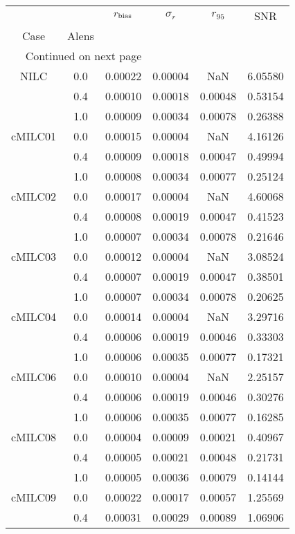 \begin{longtable}{cccccc}
\toprule
     &     &  $r_{\rm bias}$  &  $\sigma_r$ &  $r_{95}$ &     SNR \\
Case & Alens &                  &             &           &         \\
\midrule
\endhead
\midrule
\multicolumn{3}{r}{{Continued on next page}} \\
\midrule
\endfoot

\bottomrule
\endlastfoot
NILC & 0.0 & 0.00022 & 0.00004 & NaN & 6.05580 \\
     & 0.4 & 0.00010 & 0.00018 & 0.00048 & 0.53154 \\
     & 1.0 & 0.00009 & 0.00034 & 0.00078 & 0.26388 \\
cMILC01 & 0.0 & 0.00015 & 0.00004 & NaN & 4.16126 \\
     & 0.4 & 0.00009 & 0.00018 & 0.00047 & 0.49994 \\
     & 1.0 & 0.00008 & 0.00034 & 0.00077 & 0.25124 \\
cMILC02 & 0.0 & 0.00017 & 0.00004 & NaN & 4.60068 \\
     & 0.4 & 0.00008 & 0.00019 & 0.00047 & 0.41523 \\
     & 1.0 & 0.00007 & 0.00034 & 0.00078 & 0.21646 \\
cMILC03 & 0.0 & 0.00012 & 0.00004 & NaN & 3.08524 \\
     & 0.4 & 0.00007 & 0.00019 & 0.00047 & 0.38501 \\
     & 1.0 & 0.00007 & 0.00034 & 0.00078 & 0.20625 \\
cMILC04 & 0.0 & 0.00014 & 0.00004 & NaN & 3.29716 \\
     & 0.4 & 0.00006 & 0.00019 & 0.00046 & 0.33303 \\
     & 1.0 & 0.00006 & 0.00035 & 0.00077 & 0.17321 \\
cMILC06 & 0.0 & 0.00010 & 0.00004 & NaN & 2.25157 \\
     & 0.4 & 0.00006 & 0.00019 & 0.00046 & 0.30276 \\
     & 1.0 & 0.00006 & 0.00035 & 0.00077 & 0.16285 \\
cMILC08 & 0.0 & 0.00004 & 0.00009 & 0.00021 & 0.40967 \\
     & 0.4 & 0.00005 & 0.00021 & 0.00048 & 0.21731 \\
     & 1.0 & 0.00005 & 0.00036 & 0.00079 & 0.14144 \\
cMILC09 & 0.0 & 0.00022 & 0.00017 & 0.00057 & 1.25569 \\
     & 0.4 & 0.00031 & 0.00029 & 0.00089 & 1.06906 \\

\end{longtable}
